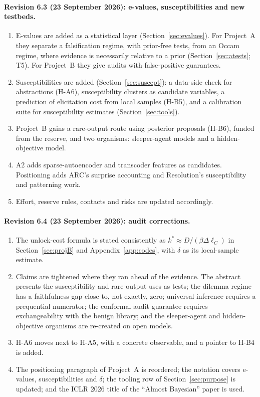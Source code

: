 \documentclass[11pt,a4paper]{article}
\begin{document}
\paragraph{Revision 6.3 (23 September 2026): e-values, susceptibilities and new testbeds.}
\begin{enumerate}[leftmargin=*]
\item E-values are added as a statistical layer (Section~\ref{sec:evalues}).
For Project~A they separate a falsification regime, with prior-free
tests, from an Occam regime, where evidence is necessarily relative to a
prior (Section~\ref{sec:atests}; T5). For Project~B they give audits with
false-positive guarantees.
\item Susceptibilities are added (Section~\ref{sec:suscept}): a data-side
check for abstractions (H-A6), susceptibility clusters as candidate
variables, a prediction of elicitation cost from local samples (H-B5),
and a calibration suite for susceptibility estimates
(Section~\ref{sec:tools}).
\item Project~B gains a rare-output route using posterior proposals (H-B6),
funded from the reserve, and two organisms: sleeper-agent models and a
hidden-objective model.
\item A2 adds sparse-autoencoder and transcoder features as candidates.
Positioning adds ARC's surprise accounting and Resolution's susceptibility
and patterning work.
\item Effort, reserve rules, contacts and risks are updated accordingly.
\end{enumerate}

\paragraph{Revision 6.4 (23 September 2026): audit corrections.}
\begin{enumerate}[leftmargin=*]
\item The unlock-cost formula is stated consistently as
$k^*\approx D/(\beta\Delta\ell_C)$ in Section~\ref{sec:projB} and
Appendix~\ref{app:codes}, with $\delta$ as its local-sample estimate.
\item Claims are tightened where they ran ahead of the evidence. The
abstract presents the susceptibility and rare-output uses as tests; the
dilemma regime has a faithfulness gap close to, not exactly, zero;
universal inference requires a prequential numerator; the conformal audit
guarantee requires exchangeability with the benign library; and the
sleeper-agent and hidden-objective organisms are re-created on open models.
\item H-A6 moves next to H-A5, with a concrete observable, and a pointer to
H-B4 is added.
\item The positioning paragraph of Project~A is reordered; the notation
covers e-values, susceptibilities and $\delta$; the tooling row of
Section~\ref{sec:purpose} is updated; and the ICLR 2026 title of the
``Almost Bayesian'' paper is used.
\end{enumerate}
\end{document}
